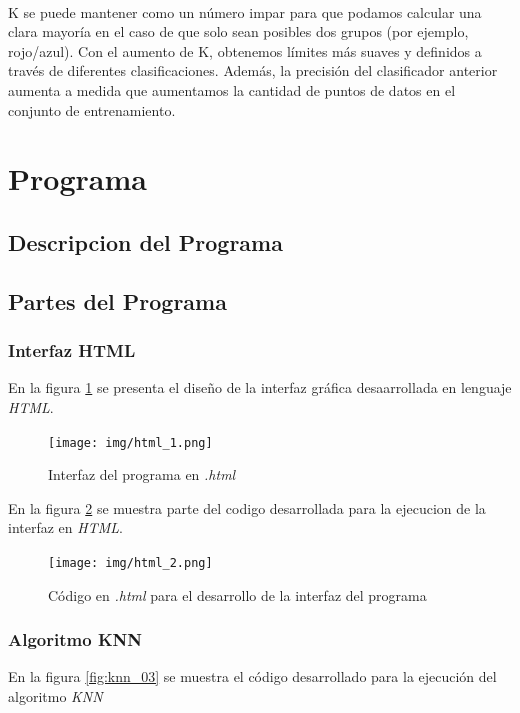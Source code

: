 \documentclass{article}
\begin{document}
\paragraph{}
K se puede mantener como un número impar para que podamos calcular una clara mayoría en el caso de que solo sean posibles dos grupos (por ejemplo, rojo/azul). Con el aumento de K, obtenemos límites más suaves y definidos a través de diferentes clasificaciones. Además, la precisión del clasificador anterior aumenta a medida que aumentamos la cantidad de puntos de datos en el conjunto de entrenamiento.

\clearpage
\section{Programa}

\subsection{Descripcion del Programa}
\paragraph{}

\clearpage
\subsection{Partes del Programa}
\subsubsection{Interfaz HTML}
En la figura \ref{fig:html_1} se presenta el diseño de la interfaz gráfica desaarrollada en lenguaje \textit{HTML}.

\begin{figure}[h!]
	\centering
	\texttt{[image: img/html\_1.png]}
	\caption{Interfaz del programa en \textit{.html}}
	\label{fig:html_1}
\end{figure}

En la figura \ref{fig:html_2} se muestra parte del codigo desarrollada para la ejecucion de la interfaz en \textit{HTML}.

\begin{figure}[h!]
	\centering
	\texttt{[image: img/html\_2.png]}
	\caption{Código en \textit{.html} para el desarrollo de la interfaz del programa }
	\label{fig:html_2}
\end{figure}

\clearpage
\subsubsection{Algoritmo KNN}
En la figura \ref{fig:knn_03} se muestra el código desarrollado para la ejecución del algoritmo \textit{KNN}
\end{document}
